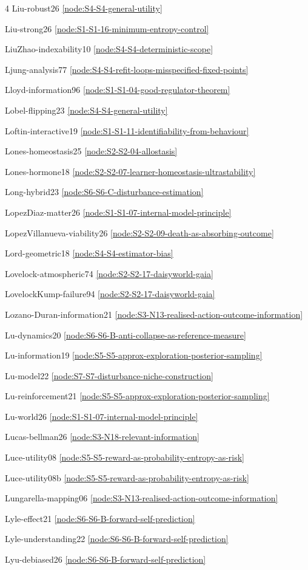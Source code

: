 \documentclass[10pt]{article}
\begin{document}
{\begin{multicols}{4}
Liu-robust26 \hfill \ref{node:S4-S4-general-utility}\par
Liu-strong26 \hfill \ref{node:S1-S1-16-minimum-entropy-control}\par
LiuZhao-indexability10 \hfill \ref{node:S4-S4-deterministic-scope}\par
Ljung-analysis77 \hfill \ref{node:S4-S4-refit-loops-misspecified-fixed-points}\par
Lloyd-information96 \hfill \ref{node:S1-S1-04-good-regulator-theorem}\par
Lobel-flipping23 \hfill \ref{node:S4-S4-general-utility}\par
Loftin-interactive19 \hfill \ref{node:S1-S1-11-identifiability-from-behaviour}\par
Lones-homeostasis25 \hfill \ref{node:S2-S2-04-allostasis}\par
Lones-hormone18 \hfill \ref{node:S2-S2-07-learner-homeostasis-ultrastability}\par
Long-hybrid23 \hfill \ref{node:S6-S6-C-disturbance-estimation}\par
LopezDiaz-matter26 \hfill \ref{node:S1-S1-07-internal-model-principle}\par
LopezVillanueva-viability26 \hfill \ref{node:S2-S2-09-death-as-absorbing-outcome}\par
Lord-geometric18 \hfill \ref{node:S4-S4-estimator-bias}\par
Lovelock-atmospheric74 \hfill \ref{node:S2-S2-17-daisyworld-gaia}\par
LovelockKump-failure94 \hfill \ref{node:S2-S2-17-daisyworld-gaia}\par
Lozano-Duran-information21 \hfill \ref{node:S3-N13-realised-action-outcome-information}\par
Lu-dynamics20 \hfill \ref{node:S6-S6-B-anti-collapse-as-reference-measure}\par
Lu-information19 \hfill \ref{node:S5-S5-approx-exploration-posterior-sampling}\par
Lu-model22 \hfill \ref{node:S7-S7-disturbance-niche-construction}\par
Lu-reinforcement21 \hfill \ref{node:S5-S5-approx-exploration-posterior-sampling}\par
Lu-world26 \hfill \ref{node:S1-S1-07-internal-model-principle}\par
Lucas-bellman26 \hfill \ref{node:S3-N18-relevant-information}\par
Luce-utility08 \hfill \ref{node:S5-S5-reward-as-probability-entropy-as-risk}\par
Luce-utility08b \hfill \ref{node:S5-S5-reward-as-probability-entropy-as-risk}\par
Lungarella-mapping06 \hfill \ref{node:S3-N13-realised-action-outcome-information}\par
Lyle-effect21 \hfill \ref{node:S6-S6-B-forward-self-prediction}\par
Lyle-understanding22 \hfill \ref{node:S6-S6-B-forward-self-prediction}\par
Lyu-debiased26 \hfill \ref{node:S6-S6-B-forward-self-prediction}\par


\end{multicols}}
\end{document}
